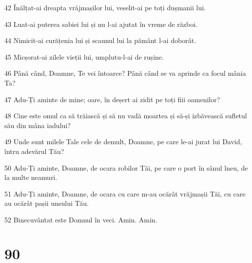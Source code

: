 \par 42 Înălțat-ai dreapta vrăjmașilor lui, veselit-ai pe toți dușmanii lui.
\par 43 Luat-ai puterea sabiei lui și nu l-ai ajutat în vreme de război.
\par 44 Nimicit-ai curățenia lui și scaunul lui la pământ l-ai doborât.
\par 45 Micșorat-ai zilele vieții lui, umplutu-l-ai de rușine.
\par 46 Până când, Doamne, Te vei întoarce? Până când se va aprinde ca focul mânia Ta?
\par 47 Adu-Ți aminte de mine; oare, în deșert ai zidit pe toți fiii oamenilor?
\par 48 Cine este omul ca să trăiască și să nu vadă moartea și să-și izbăvească sufletul său din mâna iadului?
\par 49 Unde sunt milele Tale cele de demult, Doamne, pe care le-ai jurat lui David, întru adevărul Tău?
\par 50 Adu-Ți aminte, Doamne, de ocara robilor Tăi, pe care o port în sânul lneu, de la multe neamuri.
\par 51 Adu-Ți aminte, Doamne, de ocara cu care m-au ocărât vrăjmașii Tăi, cu care au ocărât pașii unsului Tău.
\par 52 Binecuvântat este Domnul în veci. Amin. Amin.

\chapter{90}

